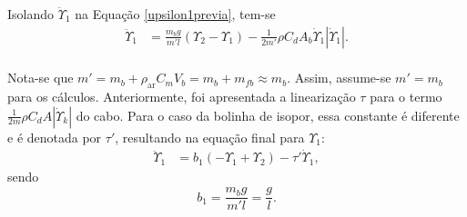  Isolando $\ddot{\Upsilon}_1$ na Equação \ref{upsilon1previa}, tem-se \begin{align}
 	\ddot{\Upsilon}_1 &= \frac{m_b g}{m'l}\left(\Upsilon_2 - \Upsilon_1\right)  - \frac{1}{2m'}\rho C_d A_b \dot{\Upsilon}_1 \left|\dot{\Upsilon}_1\right|.
 \end{align} 
 
 \paragraph{} Nota-se que $m' = m_b + \rho_{\textrm{ar}} C_m V_b = m_b + m_{fb} \approx m_b$. Assim, assume-se $m' = m_b$ para os cálculos. Anteriormente, foi apresentada a linearização $\tau$ para o termo $\frac{1}{2m}\rho C_d A\left|\dot{\Upsilon}_k\right|$ do cabo. Para o caso da bolinha de isopor, essa constante é diferente e é denotada por $\tau'$, resultando na equação final para $\Upsilon_1$: \begin{align}
 	\ddot{\Upsilon}_1 &= b_1\left(-\Upsilon_1 + \Upsilon_2\right) - \tau'\dot{\Upsilon}_1\label{upsilon1final},
 \end{align} sendo \begin{equation}
 	b_1 = \frac{m_b g}{m'l} = \frac{g}{l}.
 \end{equation}

